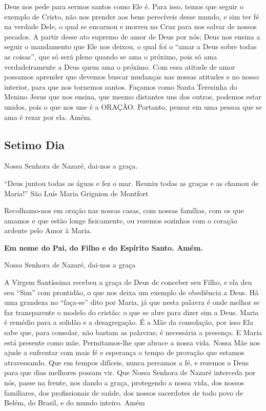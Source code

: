 \documentclass[a4paper,14pt]{extarticle} \usepackage[utf8]{inputenc}
\begin{document}
Deus nos pede para sermos santos como Ele é. Para isso, temos que seguir o exemplo de Cristo, não nos prender aos bens perecíveis desse mundo, e sim ter fé na verdade Dele, o qual se encarnou e morreu na Cruz para nos salvar de nossos pecados. A partir desse ato supremo de amor de Deus por nós; Deus nos ensina a seguir o mandamento que Ele nos deixou, o qual foi o “amar a Deus sobre todas as coisas”, que só será pleno quando se ama o próximo, pois só ama verdadeiramente a Deus quem ama o próximo. Com essa atitude de amor possamos aprender que devemos buscar mudanças nas nossas atitudes e no nosso interior, para que nos tornemos santos. Façamos como Santa Teresinha do Menino Jesus que nos ensina, que mesmo distantes uns dos outros, podemos estar unidos, pois o que nos une é a ORAÇÃO. Portanto, pensar em uma pessoa que se ama é rezar por ela. Amém.

\textbf{}

\subsection{Setimo Dia}

\textbf{}

Nossa Senhora de Nazaré, dai-nos a graça.

“Deus juntou todas as águas e fez o mar. Reuniu todas as graças e as chamou de Maria!” São Luís Maria Grignion de Montfort

Recolhamo-nos em oração nas nossas casas, com nossas famílias, com os que amamos e que estão longe fisicamente, ou rezemos sozinhos com o coração ardente pelo Amor à Maria.

\textbf{Em nome do Pai, do Filho e do Espírito Santo. Amém.}

Nossa Senhora de Nazaré, dai-nos a graça

A Virgem Santíssima recebeu a graça de Deus de conceber seu Filho, e ela deu seu “Sim” com prontidão, o que nos deixa um exemplo de obediência a Deus. Há uma grandeza no “faça-se” dito por Maria, já que nesta palavra é onde melhor se faz transparente o modelo do cristão: o que se abre para dizer sim a Deus. Maria é remédio para a solidão e a desagregação. É a Mãe da consolação, por isso Ela sabe que, para consolar, não bastam as palavras; é necessária a presença. E Maria está presente como mãe. Permitamos-lhe que abrace a nossa vida. Nossa Mãe nos ajude a enfrentar com mais fé e esperança o tempo de provação que estamos atravessando. Que em tempos difíceis, nunca percamos a fé, e rezemos a Deus para que dias melhores possam vir. Que Nossa Senhora de Nazaré interceda por nós, passe na frente, nos dando a graça, protegendo a nossa vida, dos nossos familiares, dos profissionais de saúde, dos nossos sacerdotes de todo povo de Belém, do Brasil, e do mundo inteiro. Amém
\end{document}
